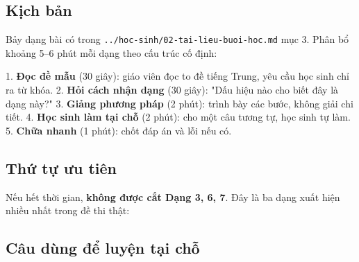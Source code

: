 \documentclass[11pt, a4paper]{article}
\begin{document}
\subsection{Kịch bản}

Bảy dạng bài có trong \texttt{../hoc-sinh/02-tai-lieu-buoi-hoc.md} mục 3. Phân bổ khoảng 5–6 phút mỗi dạng theo cấu trúc cố định:

1. \textbf{Đọc đề mẫu} (30 giây): giáo viên đọc to đề tiếng Trung, yêu cầu học sinh chỉ ra từ khóa.
2. \textbf{Hỏi cách nhận dạng} (30 giây): "Dấu hiệu nào cho biết đây là dạng này?"
3. \textbf{Giảng phương pháp} (2 phút): trình bày các bước, không giải chi tiết.
4. \textbf{Học sinh làm tại chỗ} (2 phút): cho một câu tương tự, học sinh tự làm.
5. \textbf{Chữa nhanh} (1 phút): chốt đáp án và lỗi nếu có.

\subsection{Thứ tự ưu tiên}

Nếu hết thời gian, \textbf{không được cắt Dạng 3, 6, 7}. Đây là ba dạng xuất hiện nhiều nhất trong đề thi thật:


\subsection{Câu dùng để luyện tại chỗ}
\end{document}
